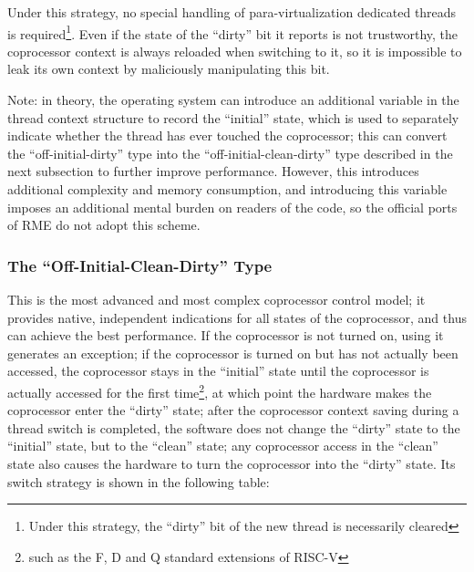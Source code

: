 Under this strategy, no special handling of para-virtualization dedicated threads is required\footnote{Under this strategy, the ``dirty'' bit of the new thread is necessarily cleared}. Even if the state of the ``dirty'' bit it reports is not trustworthy, the coprocessor context is always reloaded when switching to it, so it is impossible to leak its own context by maliciously manipulating this bit.

Note: in theory, the operating system can introduce an additional variable in the thread context structure to record the ``initial'' state, which is used to separately indicate whether the thread has ever touched the coprocessor; this can convert the ``off-initial-dirty'' type into the ``off-initial-clean-dirty'' type described in the next subsection to further improve performance. However, this introduces additional complexity and memory consumption, and introducing this variable imposes an additional mental burden on readers of the code, so the official ports of RME do not adopt this scheme.

\subsubsection{The ``Off-Initial-Clean-Dirty'' Type}\label{subsubsec:9-coproc-off-initial-clean-dirty}

This is the most advanced and most complex coprocessor control model; it provides native, independent indications for all states of the coprocessor, and thus can achieve the best performance. If the coprocessor is not turned on, using it generates an exception; if the coprocessor is turned on but has not actually been accessed, the coprocessor stays in the ``initial'' state until the coprocessor is actually accessed for the first time\footnote{such as the F, D and Q standard extensions of RISC-V}, at which point the hardware makes the coprocessor enter the ``dirty'' state; after the coprocessor context saving during a thread switch is completed, the software does not change the ``dirty'' state to the ``initial'' state, but to the ``clean'' state; any coprocessor access in the ``clean'' state also causes the hardware to turn the coprocessor into the ``dirty'' state. Its switch strategy is shown in the following table:

